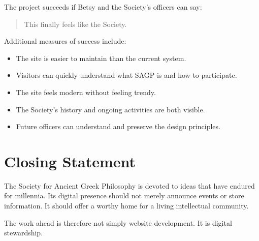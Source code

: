 \documentclass[11pt]{article}
\begin{document}
The project succeeds if Betsy and the Society's officers can say:

\begin{quote}
This finally feels like the Society.
\end{quote}

Additional measures of success include:

\begin{itemize}[leftmargin=2em]
    \item The site is easier to maintain than the current system.
    \item Visitors can quickly understand what SAGP is and how to participate.
    \item The site feels modern without feeling trendy.
    \item The Society's history and ongoing activities are both visible.
    \item Future officers can understand and preserve the design principles.
\end{itemize}

\section{Closing Statement}

The Society for Ancient Greek Philosophy is devoted to ideas that have endured for millennia. Its digital presence should not merely announce events or store information. It should offer a worthy home for a living intellectual community.

The work ahead is therefore not simply website development. It is digital stewardship.
\end{document}
